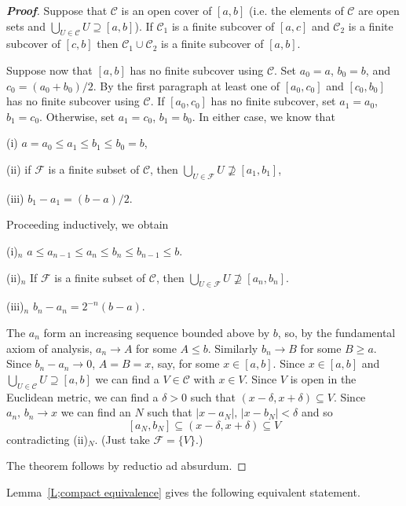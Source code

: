 \begin{proof}[\bf Proof] Suppose that ${\mathcal C}$
is an open cover of $[a,b]$ (i.e. the elements of ${\mathcal C}$
are open sets and $\bigcup_{U\in{\mathcal C}}U\supseteq[a,b]$). 
If  ${\mathcal C}_{1}$
is a finite subcover of $[a,c]$
and ${\mathcal C}_{2}$
is a finite subcover of $[c,b]$
then ${\mathcal C}_{1}\cup{\mathcal C}_{2}$
is a finite subcover of $[a,b]$. 

Suppose now that $[a,b]$ has no finite subcover using ${\mathcal C}$.
Set $a_{0}=a$, $b_{0}=b$, and $c_{0}=(a_{0}+b_{0})/2$.
By the first paragraph at least one of $[a_{0},c_{0}]$
and $[c_{0},b_{0}]$ has no finite subcover using ${\mathcal C}$.
If $[a_{0},c_{0}]$ has no finite subcover, set $a_{1}=a_{0}$,
$b_{1}=c_{0}$. Otherwise, set $a_{1}=c_{0}$,
$b_{1}=b_{0}$. In either case, we know that

(i) $a=a_{0}\leq a_{1}\leq b_{1}\leq b_{0}=b$,

(ii) if ${\mathcal F}$ is a finite subset of ${\mathcal C}$,
then $\bigcup_{U\in{\mathcal F}}U\not\supseteq [a_{1},b_{1}]$,

(iii) $b_{1}-a_{1}=(b-a)/2$.

Proceeding inductively, we obtain

(i)$_{n}$ $a\leq a_{n-1}\leq a_{n}\leq b_{n}\leq b_{n-1}\leq b$.

(ii)$_{n}$ If ${\mathcal F}$ is a finite subset of ${\mathcal C}$,
then $\bigcup_{U\in{\mathcal F}}U\not\supseteq [a_{n},b_{n}]$.

(iii)$_{n}$ $b_{n}-a_{n}=2^{-n}(b-a)$.

The $a_{n}$ form an increasing sequence bounded above by $b$, so,
by the fundamental axiom of analysis, $a_{n}\rightarrow A$
for some $A \leq b$. Similarly $b_{n}\rightarrow B$ for some
$B\geq a$. Since $b_{n}-a_{n}\rightarrow 0$, $A=B=x$, say,
for some $x\in [a,b]$. Since $x\in [a,b]$ and
$\bigcup_{U\in{\mathcal C}}U\supseteq[a,b]$ 
we can find a $V\in {\mathcal C}$
with $x\in V$. Since $V$ is open in the Euclidean metric, 
we can find a $\delta>0$
such that $(x-\delta,x+\delta)\subseteq V$. Since $a_{n},\,b_{n}\rightarrow x$
we can find an $N$ such that $|x-a_{N}|,\,|x-b_{N}|<\delta$ and so
\[[a_{N},b_{N}]\subseteq (x-\delta,x+\delta)\subseteq V\]
contradicting (ii)$_{N}$. (Just take ${\mathcal F}=\{V\}$.) 

The theorem follows by reductio ad absurdum.
\end{proof}


Lemma~\ref{L;compact equivalence} gives the following equivalent statement. 

